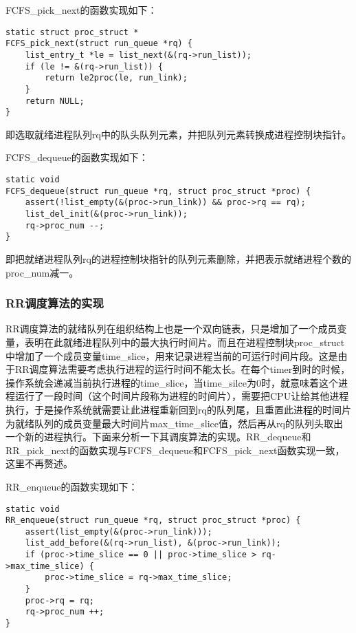FCFS\_pick\_next的函数实现如下：

\begin{lstlisting}
static struct proc_struct *
FCFS_pick_next(struct run_queue *rq) {
    list_entry_t *le = list_next(&(rq->run_list));
    if (le != &(rq->run_list)) {
        return le2proc(le, run_link);
    }
    return NULL;
}
\end{lstlisting}

即选取就绪进程队列rq中的队头队列元素，并把队列元素转换成进程控制块指针。

FCFS\_dequeue的函数实现如下：

\begin{lstlisting}
static void
FCFS_dequeue(struct run_queue *rq, struct proc_struct *proc) {
    assert(!list_empty(&(proc->run_link)) && proc->rq == rq);
    list_del_init(&(proc->run_link));
    rq->proc_num --;
}
\end{lstlisting}

即把就绪进程队列rq的进程控制块指针的队列元素删除，并把表示就绪进程个数的proc\_num减一。

\subsubsection{RR调度算法的实现}\label{rrux8c03ux5ea6ux7b97ux6cd5ux7684ux5b9eux73b0}

RR调度算法的就绪队列在组织结构上也是一个双向链表，只是增加了一个成员变量，表明在此就绪进程队列中的最大执行时间片。而且在进程控制块proc\_struct中增加了一个成员变量time\_slice，用来记录进程当前的可运行时间片段。这是由于RR调度算法需要考虑执行进程的运行时间不能太长。在每个timer到时的时候，操作系统会递减当前执行进程的time\_slice，当time\_silce为0时，就意味着这个进程运行了一段时间（这个时间片段称为进程的时间片），需要把CPU让给其他进程执行，于是操作系统就需要让此进程重新回到rq的队列尾，且重置此进程的时间片为就绪队列的成员变量最大时间片max\_time\_slice值，然后再从rq的队列头取出一个新的进程执行。下面来分析一下其调度算法的实现。RR\_dequeue和RR\_pick\_next的函数实现与FCFS\_dequeue和FCFS\_pick\_next函数实现一致，这里不再赘述。

RR\_enqueue的函数实现如下：

\begin{lstlisting}
static void
RR_enqueue(struct run_queue *rq, struct proc_struct *proc) {
    assert(list_empty(&(proc->run_link)));
    list_add_before(&(rq->run_list), &(proc->run_link));
    if (proc->time_slice == 0 || proc->time_slice > rq->max_time_slice) {
        proc->time_slice = rq->max_time_slice;
    }
    proc->rq = rq;
    rq->proc_num ++;
}
\end{lstlisting}


